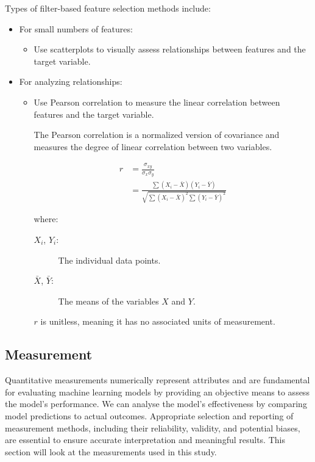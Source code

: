 	Types of filter-based feature selection methods include:
	\begin{itemize}
		\item For small numbers of features:
		\begin{itemize}
			\item Use scatterplots to visually assess relationships between features and the target variable.
		\end{itemize}
		\item For analyzing relationships:
		\begin{itemize}
			\item Use Pearson correlation to measure the linear correlation between features and the target variable.
			
		The Pearson correlation is a normalized version of covariance\cite{penny2008mathematics} and measures the degree of linear correlation between two variables.
			
			
			\begin{align*}
				r &= \frac{\sigma_{xy}}{\sigma_x\sigma_y}\\
				  &= \frac{\sum (X_i - \bar{X})(Y_i - \bar{Y}) }{\sqrt{\sum (X_i - \bar{X})^2 \sum (Y_i - \bar{Y})^2}}
			\end{align*}
			
			
			
			where:
			\begin{description}
				\item[$X_i$, $Y_i$:] The individual data points.
				\item[$\bar{X}$, $\bar{Y}$:] The means of the variables $X$ and $Y$.
			\end{description}
			
			$r$ is unitless, meaning it has no associated units of measurement.
			
			
		\end{itemize}
	\end{itemize}
	
	
	
	
	
	\subsection{Measurement}
	
		Quantitative measurements numerically represent attributes and are fundamental for evaluating machine learning models by providing an objective means to assess the model's performance. We can analyse the model's effectiveness by comparing model predictions to actual outcomes. Appropriate selection and reporting of measurement methods, including their reliability, validity, and potential biases, are essential to ensure accurate interpretation and meaningful results. This section will look at the measurements used in this study.
		
